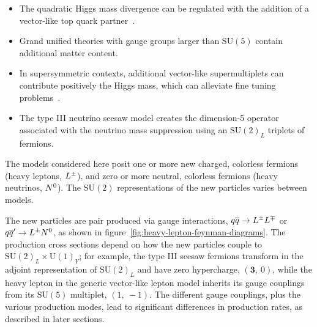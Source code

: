 \begin{itemize}
  \item The quadratic Higgs mass divergence can be regulated with the addition of a vector-like top quark partner~\cite{DeSimone:2012fs}. 
  \item Grand unified theories with gauge groups larger than $\mathrm{SU}(5)$ contain additional matter content. 
  \item In supersymmetric contexts, additional vector-like supermultiplets can contribute positively the Higgs mass, which can alleviate fine tuning problems~\cite{Hall:2011aa, Martin:2009bg}.
  \item The type III neutrino seesaw model creates the dimension-5 operator associated with the neutrino mass suppression using an $\mathrm{SU}(2)_L$ triplets of fermions.
\end{itemize}

The models considered here posit one or more new charged, colorless fermions (heavy leptons, $L^{\pm}$), and zero or more neutral, colorless fermions (heavy neutrinos, $N^{0}$). The $\mathrm{SU}(2)$ representations of the new particles varies between models.

The new particles are pair produced via gauge interactions, $q\overline{q}\rightarrow L^{\pm}L^{\mp}$ or $q\overline{q}'\rightarrow L^{\pm}N^{0}$, as shown in figure~\ref{fig:heavy-lepton-feynman-diagrams}. The production cross sections depend on how the new particles couple to $\mathrm{SU}(2)_L\times \mathrm{U}(1)_Y$; for example, the type III seesaw fermions transform in the adjoint representation of $\mathrm{SU}(2)_L$ and have zero hypercharge, $(\mathbf{3},\ 0)$, while the heavy lepton in the generic vector-like lepton model inherits its gauge couplings from its $\mathrm{SU}(5)$ multiplet, $(1,\ -1)$.  The different gauge couplings, plus the various production modes, lead to significant differences in production rates, as described in later sections.

